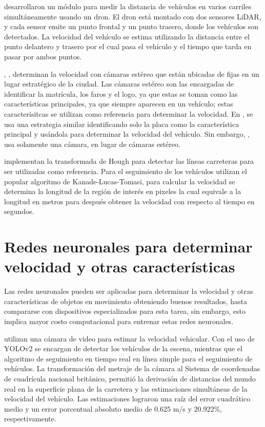 \citeauthor{lee2021Study} desarrollaron un módulo para medir la distancia de vehículos en varios carriles simultáneamente usando un dron. El dron está montado con dos sensores LiDAR, y cada sensor emite un punto frontal y un punto trasero, donde los vehículos son detectados. La velocidad del vehículo se estima utilizando la distancia entre el punto delantero y trasero por el cual pasa el vehículo y el tiempo que tarda en pasar por ambos puntos.


\citeauthor{yang2021Robust}, \citeauthor{yang2021Improved}, determinan la velocidad con cámaras estéreo que están ubicadas de fijas en un lugar estratégico de la ciudad. Las cámaras estéreo son las encargadas de identificar la matrícula, los faros y el logo, ya que estas se toman como las características principales, ya que siempre aparecen en un vehículo; estas caracterisitcas se utilizan como referencia para determinar la velocidad. En \citeauthor{vakili2020Single}, se usa una estrategia similar identificando solo la placa como la característica principal y usándola para determinar la velocidad del vehículo. Sin embargo, \citeauthor{vakili2020Single}, usa solamente una cámara, en lugar de cámaras estéreo.


\citeauthor{bevilacqua2016Egomotion} implementan la transformada de Hough para detectar las líneas carreteras para ser utilizadas como referencia. Para el seguimiento de los vehículos utilizan el popular algoritmo de Kanade-Lucas-Tomasi, para calcular la velocidad se determina la longitud de la región de interés en pixeles la cual equivale a la longitud en metros para después obtener la velocidad con respecto al tiempo en segundos.


\section{Redes neuronales para determinar velocidad y otras características}

Las redes neuronales pueden ser aplicadas para determinar la velocidad y otras características de objetos en movimiento obteniendo buenos resultados, hasta compararse con dispositivos especializados para esta tarea, sin embargo, esto implica mayor costo computacional para entrenar estas redes neuronales.


\citeauthor{bell2020Accurate} utilizan una cámara de video para estimar la velocidad vehicular. Con el uso de YOLOv2 se encargan de detectar los vehículos de la escena, mientras que el algoritmo de seguimiento en tiempo real en línea simple para el seguimiento de vehículos. La transformación del metraje de la cámara al Sistema de coordenadas de cuadrícula nacional británico, permitió la derivación de distancias del mundo real en la superficie plana de la carretera y las estimaciones simultáneas de la velocidad del vehículo. Las estimaciones lograron una raíz del error cuadrático medio y un error porcentual absoluto medio de 0.625 m/s y 20.922\%, respectivamente.


